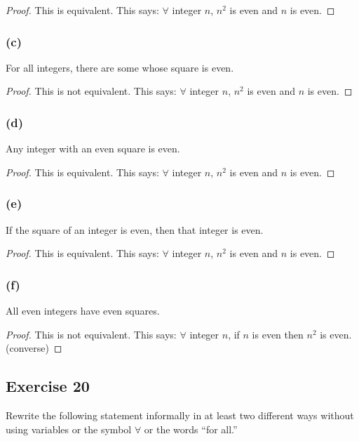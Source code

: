 \documentclass[14pt]{extarticle}
\newcommand{\fa}{\forall}
\begin{document}
\begin{proof}
    This is equivalent. This says: $\fa$ integer $n$, $n^2$ is even and $n$ is even.
\end{proof}

\subsubsection{(c)}
For all integers, there are some whose square is even.

\begin{proof}
    This is not equivalent. This says: $\fa$ integer $n$, $n^2$ is even and $n$ is even.
\end{proof}

\subsubsection{(d)}
Any integer with an even square is even.

\begin{proof}
    This is equivalent. This says: $\fa$ integer $n$, $n^2$ is even and $n$ is even.
\end{proof}

\subsubsection{(e)}
If the square of an integer is even, then that integer is even.

\begin{proof}
    This is equivalent. This says: $\fa$ integer $n$, $n^2$ is even and $n$ is even.
\end{proof}

\subsubsection{(f)}
All even integers have even squares.

\begin{proof}
    This is not equivalent. This says: $\fa$ integer $n$, if $n$ is even then $n^2$ is even. (converse)
\end{proof}

\subsection{Exercise 20}
Rewrite the following statement informally in at least two different ways without using variables or the symbol $\fa$ or the words “for all.”
\end{document}
